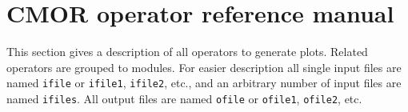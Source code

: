 \chapter{\label{refman}CMOR operator reference manual}

This section gives a description of all {\CDO} operators to generate plots.
Related operators are grouped to modules.
For easier description all single input files are named \texttt{ifile} or \texttt{ifile1}, \texttt{ifile2}, etc.,
and an arbitrary number of input files are named \texttt{ifiles}.
All output files are named \texttt{ofile} or \texttt{ofile1}, \texttt{ofile2}, etc.


\hspace{3mm}



